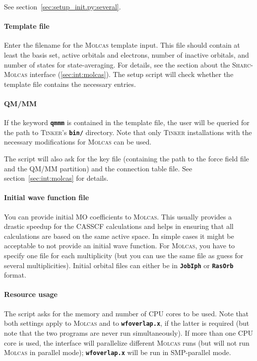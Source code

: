 \documentclass[a4paper,10pt,DIV=15,openany]{scrbook}
\newcommand{\sharc}{\textsc{Sharc}}
\newcommand{\ttt}[1]{\textbf{\texttt{#1}}}
\begin{document}
See section~\ref{sec:setup_init.py:several}.

\paragraph{Template file}

Enter the filename for the \textsc{Molcas} template input. This file should contain at least the basis set, active orbitals and electrons, number of inactive orbitals, and number of states for state-averaging. For details, see the section about the \sharc-\textsc{Molcas} interface (\ref{sec:int:molcas}). The setup script will check whether the template file contains the necessary entries. 

\paragraph{QM/MM}

If the keyword \ttt{qmmm} is contained in the template file, the user will be queried for the path to \textsc{Tinker}'s \ttt{bin/} directory. Note that only \textsc{Tinker} installations with the necessary modifications for \textsc{Molcas} can be used.

The script will also ask for the key file (containing the path to the force field file and the QM/MM partition) and the connection table file. See section~\ref{sec:int:molcas} for details.

\paragraph{Initial wave function file}

You can provide initial MO coefficients to \textsc{Molcas}. This usually provides a drastic speedup for the CASSCF calculations and helps in ensuring that all calculations are based on the same active space. In simple cases it might be acceptable to not provide an initial wave function. For \textsc{Molcas}, you have to specify one file for each multiplicity (but you can use the same file as guess for several multiplicities).
Initial orbital files can either be in \ttt{JobIph} or \ttt{RasOrb} format.

\paragraph{Resource usage}

The script asks for the memory and number of CPU cores to be used. Note that both settings apply to \textsc{Molcas} and to \ttt{wfoverlap.x}, if the latter is required (but note that the two programs are never run simultaneously).
If more than one CPU core is used, the interface will parallelize different \textsc{Molcas} runs (but will not run \textsc{Molcas} in parallel mode); \ttt{wfoverlap.x} will be run in SMP-parallel mode.
\end{document}
